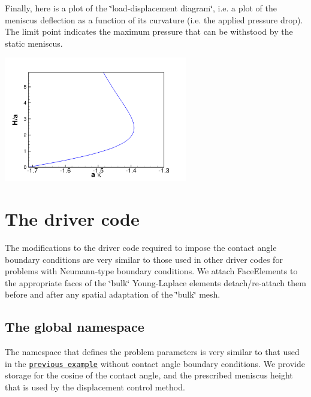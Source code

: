 Finally, here is a plot of the \char`\"{}load-\/displacement diagram\char`\"{}, i.\+e. a plot of the meniscus deflection as a function of its curvature (i.\+e. the applied pressure drop). The limit point indicates the maximum pressure that can be withstood by the static meniscus.

 
\begin{DoxyImage}
\includegraphics[width=0.6\textwidth]{t_junction_trace}
\end{DoxyImage}




 

\hypertarget{index_code}{}\section{The driver code}\label{index_code}
The modifications to the driver code required to impose the contact angle boundary conditions are very similar to those used in other driver codes for problems with Neumann-\/type boundary conditions. We attach {\ttfamily Face\+Elements} to the appropriate faces of the \char`\"{}bulk\char`\"{} Young-\/\+Laplace elements detach/re-\/attach them before and after any spatial adaptation of the \char`\"{}bulk\char`\"{} mesh.



 

\hypertarget{index_namespace}{}\subsection{The global namespace}\label{index_namespace}
The namespace that defines the problem parameters is very similar to that used in the \href{../../young_laplace/html/index.html}{\tt previous example} without contact angle boundary conditions. We provide storage for the cosine of the contact angle, and the prescribed meniscus height that is used by the displacement control method.

